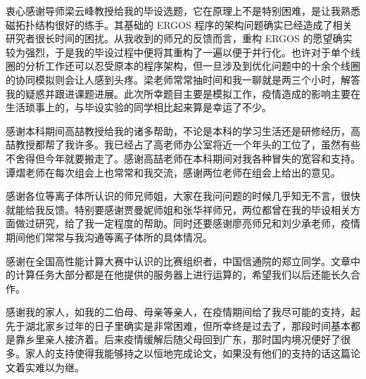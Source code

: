 \begin{acknowledgement}
  衷心感谢导师梁云峰教授给我的毕设选题，它在原理上不是特别困难，是让我熟悉磁拓扑结构很好的练手。其基础的 ERGOS 程序的架构问题确实已经造成了相关研究者很长时间的困扰。从我收到的师兄的反馈而言，重构 ERGOS 的愿望确实较为强烈，于是我的毕设过程中便将其重构了一遍以便于并行化。也许对于单个线圈的分析工作还可以忍受原本的程序架构，但一旦涉及到优化问题中的十余个线圈的协同模拟则会让人感到头疼。梁老师常常抽时间和我一聊就是两三个小时，解答我的疑惑并跟进课题进展。此次所幸题目主要是模拟工作，疫情造成的影响主要在生活琐事上的，与毕设实验的同学相比起来算是幸运了不少。
  
  感谢本科期间高喆教授给我的诸多帮助，不论是本科的学习生活还是研修经历，高喆教授都帮了我许多。我已经占了高老师办公室将近一个年头的工位了，虽然有些不舍得但今年就要搬走了。感谢高喆老师在本科期间对我各种冒失的宽容和支持。谭熠老师在每次组会上也常常和我交流，感谢两位老师在组会上给出的意见。
  
  感谢各位等离子体所认识的师兄师姐，大家在我问问题的时候几乎知无不言，很快就能给我反馈。特别要感谢贾曼妮师姐和张华祥师兄，两位都曾在我的毕设相关方面做过研究，给了我一定程度的帮助。同时还要感谢廖亮师兄和刘少承老师，疫情期间他们常常与我沟通等离子体所的具体情况。

  感谢在全国高性能计算大赛中认识的比赛组织者，中国信通院的郑立同学。文章中的计算任务大部分都是在他提供的服务器上进行运算的，希望我们以后还能长久合作。

  感谢我的家人，如我的二伯母、母亲等亲人，在疫情期间给了我尽可能的支持，起先于湖北家乡过年的日子里确实是非常困难，但所幸终是过去了，那段时间基本都是靠乡里亲人接济着。后来疫情缓解后随父母回到广东，那时国内境况便好了很多。家人的支持使得我能够持之以恒地完成论文，如果没有他们的支持的话这篇论文着实难以为继。


\end{acknowledgement}
